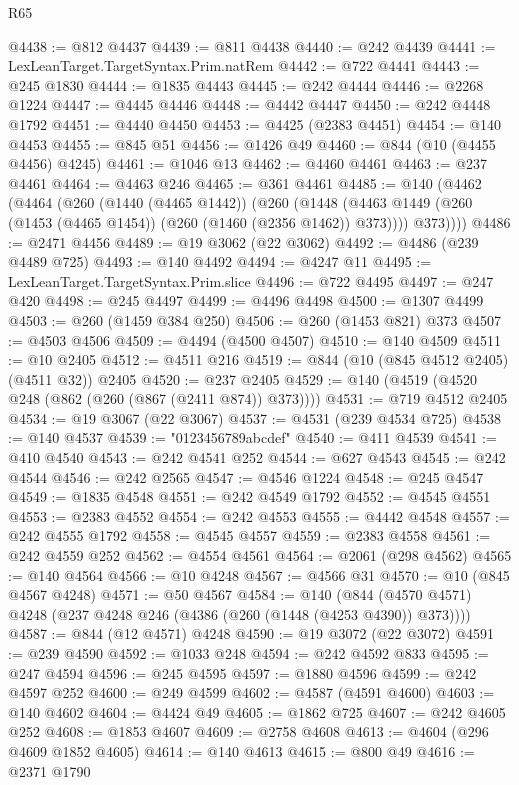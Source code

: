 \begin{lexlean}{R65}
\begin{coremodule}
{@4438 := @812 @4437
@4439 := @811 @4438
@4440 := @242 @4439
@4441 := LexLeanTarget.TargetSyntax.Prim.natRem
@4442 := @722 @4441
@4443 := @245 @1830
@4444 := @1835 @4443
@4445 := @242 @4444
@4446 := @2268 @1224
@4447 := @4445 @4446
@4448 := @4442 @4447
@4450 := @242 @4448 @1792
@4451 := @4440 @4450
@4453 := @4425 (@2383 @4451)
@4454 := @140 @4453
@4455 := @845 @51
@4456 := @1426 @49
@4460 := @844 (@10 (@4455 @4456) @4245)
@4461 := @1046 @13
@4462 := @4460 @4461
@4463 := @237 @4461
@4464 := @4463 @246
@4465 := @361 @4461
@4485 := @140
    (@4462
      (@4464
        (@260
          (@1440 (@4465 @1442))
          (@260
            (@1448 (@4463 @1449 (@260 (@1453 (@4465 @1454)) (@260 (@1460 (@2356 @1462)) @373))))
            @373))))
@4486 := @2471 @4456
@4489 := @19 @3062 (@22 @3062)
@4492 := @4486 (@239 @4489 @725)
@4493 := @140 @4492
@4494 := @4247 @11
@4495 := LexLeanTarget.TargetSyntax.Prim.slice
@4496 := @722 @4495
@4497 := @247 @420
@4498 := @245 @4497
@4499 := @4496 @4498
@4500 := @1307 @4499
@4503 := @260 (@1459 @384 @250)
@4506 := @260 (@1453 @821) @373
@4507 := @4503 @4506
@4509 := @4494 (@4500 @4507)
@4510 := @140 @4509
@4511 := @10 @2405
@4512 := @4511 @216
@4519 := @844 (@10 (@845 @4512 @2405) (@4511 @32)) @2405
@4520 := @237 @2405
@4529 := @140 (@4519 (@4520 @248 (@862 (@260 (@867 (@2411 @874)) @373))))
@4531 := @719 @4512 @2405
@4534 := @19 @3067 (@22 @3067)
@4537 := @4531 (@239 @4534 @725)
@4538 := @140 @4537
@4539 := "0123456789abcdef"
@4540 := @411 @4539
@4541 := @410 @4540
@4543 := @242 @4541 @252
@4544 := @627 @4543
@4545 := @242 @4544
@4546 := @242 @2565
@4547 := @4546 @1224
@4548 := @245 @4547
@4549 := @1835 @4548
@4551 := @242 @4549 @1792
@4552 := @4545 @4551
@4553 := @2383 @4552
@4554 := @242 @4553
@4555 := @4442 @4548
@4557 := @242 @4555 @1792
@4558 := @4545 @4557
@4559 := @2383 @4558
@4561 := @242 @4559 @252
@4562 := @4554 @4561
@4564 := @2061 (@298 @4562)
@4565 := @140 @4564
@4566 := @10 @4248
@4567 := @4566 @31
@4570 := @10 (@845 @4567 @4248)
@4571 := @50 @4567
@4584 := @140 (@844 (@4570 @4571) @4248 (@237 @4248 @246 (@4386 (@260 (@1448 (@4253 @4390)) @373))))
@4587 := @844 (@12 @4571) @4248
@4590 := @19 @3072 (@22 @3072)
@4591 := @239 @4590
@4592 := @1033 @248
@4594 := @242 @4592 @833
@4595 := @247 @4594
@4596 := @245 @4595
@4597 := @1880 @4596
@4599 := @242 @4597 @252
@4600 := @249 @4599
@4602 := @4587 (@4591 @4600)
@4603 := @140 @4602
@4604 := @4424 @49
@4605 := @1862 @725
@4607 := @242 @4605 @252
@4608 := @1853 @4607
@4609 := @2758 @4608
@4613 := @4604 (@296 @4609 @1852 @4605)
@4614 := @140 @4613
@4615 := @800 @49
@4616 := @2371 @1790
}
\end{coremodule}
\end{lexlean}
